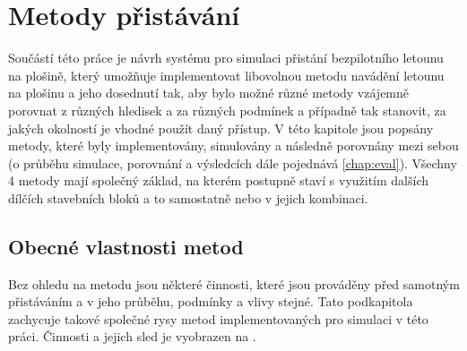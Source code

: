 \chapter{Metody přistávání} \label{chap:algs}
    Součástí této práce je návrh systému pro simulaci přistání bezpilotního letounu na plošině, který umožňuje implementovat libovolnou metodu navádění letounu na plošinu a jeho dosednutí tak, aby bylo možné různé metody vzájemně porovnat z různých hledisek a za různých podmínek a případně tak stanovit, za jakých okolností je vhodné použít daný přístup. V této kapitole jsou popsány metody, které byly implementovány, simulovány a následně porovnány mezi sebou (o průběhu simulace, porovnání a výsledcích dále pojednává \cref{chap:eval}). Všechny 4 metody mají společný základ, na kterém postupně staví s využitím dalších dílčích stavebních bloků a to samostatně nebo v jejich kombinaci.

    \section{Obecné vlastnosti metod} \label{sec:generalalg}
    Bez ohledu na metodu jsou některé činnosti, které jsou prováděny před samotným přistáváním a v jeho průběhu, podmínky a vlivy stejné. Tato podkapitola zachycuje takové společné rysy metod implementovaných pro simulaci v této práci. Činnosti a jejich sled je vyobrazen na .


